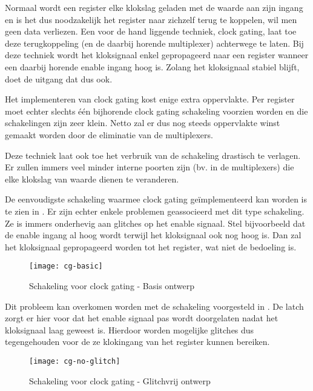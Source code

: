 Normaal wordt een register elke klokslag geladen met de waarde aan zijn ingang en is het dus noodzakelijk het register naar zichzelf terug te koppelen, wil men geen data verliezen. Een voor de hand liggende techniek, clock gating, laat toe deze terugkoppeling (en de daarbij horende multiplexer) achterwege te laten. Bij deze techniek wordt het kloksignaal enkel gepropageerd naar een register wanneer een daarbij horende enable ingang hoog is. Zolang het kloksignaal stabiel blijft, doet de uitgang dat dus ook.

Het implementeren van clock gating kost enige extra oppervlakte. Per register moet echter slechts \'e\'en bijhorende clock gating schakeling voorzien  worden en die schakelingen zijn zeer klein. Netto zal er dus nog steeds oppervlakte winst gemaakt worden door de eliminatie van de multiplexers.

Deze techniek laat ook toe het verbruik van de schakeling drastisch te verlagen. Er zullen immers veel minder interne poorten zijn (bv. in de multiplexers) die elke klokslag van waarde dienen te veranderen.

De eenvoudigste schakeling waarmee clock gating ge\"implementeerd kan worden is te zien in . Er zijn echter enkele problemen geassocieerd met dit type schakeling. Ze is immers onderhevig aan glitches op het enable signaal. Stel bijvoorbeeld dat de enable ingang al hoog wordt terwijl het kloksignaal ook nog hoog is. Dan zal het kloksignaal gepropageerd worden tot het register, wat niet de bedoeling is.

\begin{figure}[h]
	\centering
		\texttt{[image: cg-basic]}
		\caption{Schakeling voor clock gating - Basis ontwerp\label{figuur-implementatie-optimalisatie-cg-basic}}
\end{figure}

Dit probleem kan overkomen worden met de schakeling voorgesteld in . De latch zorgt er hier voor dat het enable signaal pas wordt doorgelaten nadat het kloksignaal laag geweest is. Hierdoor worden mogelijke glitches dus tegengehouden voor de ze klokingang van het register kunnen bereiken.

\begin{figure}[h]
	\centering
		\texttt{[image: cg-no-glitch]}
		\caption{Schakeling voor clock gating - Glitchvrij ontwerp\label{figuur-implementatie-optimalisatie-cg-no-glitch}}
\end{figure}

